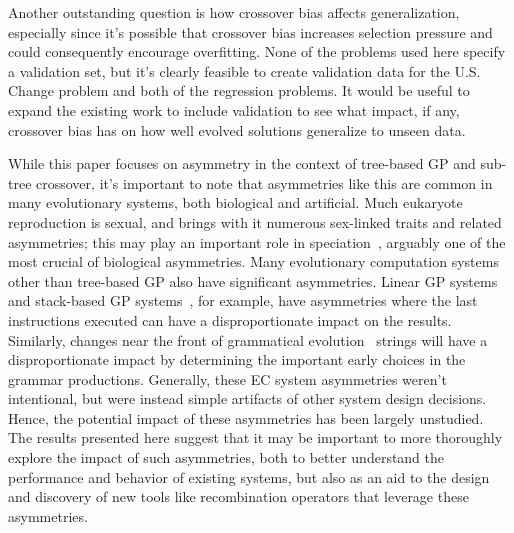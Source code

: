 \documentclass{sig-alternate}
\begin{document}
Another outstanding question is how crossover bias affects generalization, especially since it's possible that crossover
bias increases selection pressure and could consequently encourage overfitting. None of the problems used here specify
a validation set, but it's clearly feasible to create validation data for the U.S. Change problem and both of the
regression problems. It would be useful to expand the existing work to include validation to see what impact, if any,
crossover bias has on how well evolved solutions generalize to unseen data.

While this paper focuses on asymmetry in the context of tree-based GP and sub-tree crossover, it's important to note
that asymmetries like this are common in many evolutionary systems, both biological and artificial. Much eukaryote
reproduction is sexual, and brings with it numerous sex-linked traits and related asymmetries; this may play an
important role in speciation~\cite{qvarnstrom2009speciation}, arguably one of the most crucial of biological
asymmetries. Many evolutionary computation systems other than tree-based GP also have significant asymmetries. Linear
GP systems~\cite{brameier2007linear} and stack-based GP systems~\cite{spector:2002:GPEM}, for example, have asymmetries
where the last instructions executed can have a disproportionate impact on the results. Similarly, changes near the
front of grammatical evolution~\cite{o2003grammatical} strings will have a disproportionate impact by determining the
important early choices in the grammar productions. Generally, these EC system asymmetries weren't intentional, but
were instead simple artifacts of other system design decisions. Hence, the potential impact of these asymmetries has
been largely unstudied. The results presented here suggest that it may be important to more thoroughly explore the
impact of such asymmetries, both to better understand the performance and behavior of existing systems, but also as an
aid to the design and discovery of new tools like recombination operators that leverage these asymmetries.





\end{document}
